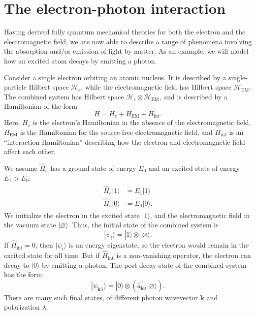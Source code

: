 \documentclass[prx,12pt]{revtex4-2}
\begin{document}
\section{The electron-photon interaction}
\label{sec:decay}

Having derived fully quantum mechanical theories for both the electron
and the electromagnetic field, we are now able to describe a range of
phenomena involving the absorption and/or emission of light by matter.
As an example, we will model how an excited atom decays by emitting a
photon.

Consider a single electron orbiting an atomic nucleus.  It is
described by a single-particle Hilbert space
$\mathscr{H}_{\mathrm{e}}$, while the electromagnetic field has
Hilbert space $\mathscr{H}_{\mathrm{EM}}$.  The combined system has
Hilbert space $\mathscr{H}_e \otimes \mathscr{H}_{\mathrm{EM}}$, and
is described by a Hamiltonian of the form
\begin{equation}
  H = H_e + H_{\mathrm{EM}} + H_{\mathrm{int}}.
\end{equation}
Here, $H_e$ is the electron's Hamiltonian in the absence of the
electromagnetic field, $H_{\mathrm{EM}}$ is the Hamiltonian for the
source-free electromagnetic field, and $H_{\mathrm{int}}$ is an
``interaction Hamiltonian'' describing how the electron and
electromagnetic field affect each other.

We assume $\hat{H}_e$ has a ground state of energy $E_0$ and an
excited state of energy $E_1 > E_0$:
\begin{align}
  \begin{aligned}
    \hat{H}_e |1\rangle &= E_1|1\rangle \\
    \hat{H}_e |0\rangle &= E_0|0\rangle.
  \end{aligned}
\end{align}
We initialize the electron in the excited state $|1\rangle$, and the
electromagnetic field in the vacuum state $|\varnothing\rangle$.
Thus, the initial state of the combined system is
\begin{equation}
  |\psi_i\rangle = |1\rangle \otimes |\varnothing\rangle.
\end{equation}
If $\hat{H}_{\mathrm{int}} = 0$, then $|\psi_i\rangle$ is an energy
eigenstate, so the electron would remain in the excited state for all
time.  But if $\hat{H}_{\mathrm{int}}$ is a non-vanishing operator,
the electron can decay to $|0\rangle$ by emitting a photon.  The
post-decay state of the combined system has the form
\begin{equation}
  | \psi_{\mathbf{k}\lambda} \rangle = |0\rangle \otimes
  \left( \hat{a}_{\mathbf{k}\lambda}^\dagger |\varnothing\rangle\right).
  \label{decaystate}
\end{equation}
There are many such final states, of different photon wavevector
$\mathbf{k}$ and polarization $\lambda$.
\end{document}
